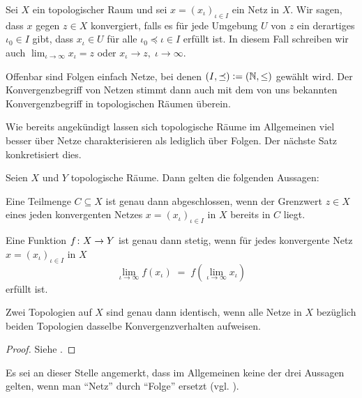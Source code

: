 \documentclass[../main/main.tex]{subfiles}
\begin{document}
	\begin{Definition}
		Sei $X$ ein topologischer Raum und sei $x = (x_\iota)_{\iota \in I}$ ein Netz in $X$. Wir sagen, dass $x$ gegen $z \in X$ konvergiert, falls
		es für jede Umgebung $U$ von $z$ ein derartiges $\iota_0 \in I$ gibt, dass $x_\iota \in U$ für alle $\iota_0 \preceq \iota \in I$ erfüllt ist.
		In diesem Fall schreiben wir auch $\lim_{\iota \to \infty} x_\iota = z$ oder $x_\iota \to z, \; \iota \to \infty$.
	\end{Definition}
	
	\begin{Bemerkung}
		Offenbar sind Folgen einfach Netze, bei denen $(I, \preceq) \vcentcolon = (\mathbb{N}, \leq)$ gewählt wird. Der Konvergenzbegriff von Netzen stimmt
		dann auch mit dem von uns bekannten Konvergenzbegriff in topologischen Räumen überein.
	\end{Bemerkung}
	
	Wie bereits angekündigt lassen sich topologische Räume im Allgemeinen viel besser über Netze charakterisieren als lediglich über Folgen. Der nächste Satz
	konkretisiert dies.
	
	\begin{Satz}
		\label{thm:netconvergence}
		Seien $X$ und $Y$ topologische Räume. Dann gelten die folgenden Aussagen:
		\begin{enumeratethm}
			\item Eine Teilmenge $C \subseteq X$ ist genau dann abgeschlossen, wenn der Grenzwert $z \in X$ eines jeden konvergenten Netzes 
			$x = (x_\iota)_{\iota \in I}$ in $X$ bereits in $C$ liegt.
			\item Eine Funktion $f \colon X \to Y$ ist genau dann stetig, wenn für jedes konvergente Netz $x = (x_\iota)_{\iota \in I}$ in $X$ 
			\[ \lim_{\iota \to \infty} f(x_\iota) \; = \; f(\lim_{\iota \to \infty} x_\iota) \]
			erfüllt ist.
			\item Zwei Topologien auf $X$ sind genau dann identisch, wenn alle Netze in $X$ bezüglich beiden Topologien dasselbe Konvergenzverhalten aufweisen.
		\end{enumeratethm}
	\end{Satz}
	
	\begin{proof}
		Siehe \cite[Satz 2.6.3]{Simon.2015}.
	\end{proof}
	
	\begin{Bemerkung}
		Es sei an dieser Stelle angemerkt, dass im Allgemeinen keine der drei Aussagen gelten, wenn man \enquote{Netz} durch \enquote{Folge} ersetzt 
		(vgl. \cite[Beispiel 2.6.1]{Simon.2015}).
	\end{Bemerkung}
	
\end{document}
